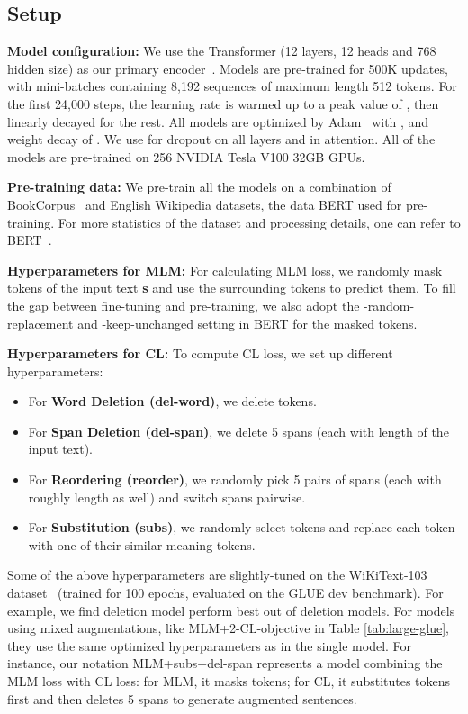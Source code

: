 \documentclass[11pt,a4paper]{article}
\begin{document}
 \subsection{Setup} \label{exp-setup}
\noindent \textbf{Model configuration:} We use the Transformer (12 layers, 12 heads and 768 hidden size) as our primary encoder~\cite{vaswani2017attention}. Models are pre-trained for 500K updates, with mini-batches containing 8,192 sequences of maximum length 512 tokens. For the first 24,000 steps, the learning rate is warmed up to a peak value of , then linearly decayed for the rest. All models are optimized by Adam~\cite{kingma2014adam} with , and  weight decay of . We use  for dropout on all layers and in attention. All of the models are pre-trained on 256 NVIDIA Tesla V100 32GB GPUs.

\noindent \textbf{Pre-training data:} We pre-train all the models on a combination of BookCorpus~\cite{zhu2015aligning} and English Wikipedia datasets, the data BERT used for pre-training. For more statistics of the dataset and processing details, one can refer to BERT~\cite{devlin2019bert}.

\noindent \textbf{Hyperparameters for MLM:} For calculating MLM loss, we randomly mask  tokens of the input text \textbf{s} and use the surrounding tokens to predict them. To fill the gap between fine-tuning and pre-training, we also adopt the -random-replacement and -keep-unchanged setting in BERT for the masked tokens.

\noindent \textbf{Hyperparameters for CL:} To compute CL loss, we set up different hyperparameters: 
\begin{itemize}
  \item For \textbf{Word Deletion (del-word)}, we delete  tokens.
  \item For \textbf{Span Deletion (del-span)}, we delete 5 spans (each with  length of the input text).
  \item For \textbf{Reordering (reorder)}, we randomly pick 5 pairs of spans (each with roughly  length as well) and switch spans pairwise.
  \item For \textbf{Substitution (subs)}, we randomly select  tokens and replace each token with one of their similar-meaning tokens.
\end{itemize}   
Some of the above hyperparameters are slightly-tuned on the WiKiText-103 dataset~\cite{merity2016pointer} (trained for 100 epochs, evaluated on the GLUE dev benchmark). For example, we find  deletion model perform best out of  deletion models. For models using mixed augmentations, like MLM+2-CL-objective in Table \ref{tab:large-glue}, they use the same optimized hyperparameters as in the single model. For instance, our notation MLM+subs+del-span represents a model combining the MLM loss with CL loss: for MLM, it masks  tokens; for CL, it substitutes  tokens first and then deletes 5 spans to generate augmented sentences. 
\end{document}
